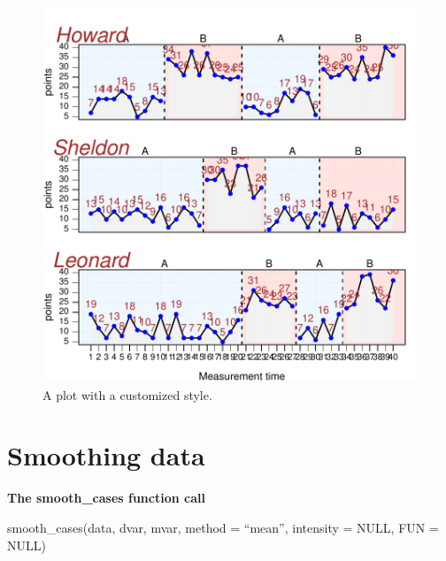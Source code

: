 \documentclass[
  letterpaper,
  DIV=11,
  numbers=noendperiod]{scrreprt}
\begin{document}
\begin{figure}[H]

{\centering \includegraphics{./app_supseded_functions_files/figure-pdf/custom_style_example-1.pdf}

}

\caption{A plot with a customized style.}

\end{figure}

\hypertarget{sec-smoothing}{%
\section{Smoothing data}\label{sec-smoothing}}

\begin{tcolorbox}[enhanced jigsaw, breakable, rightrule=.15mm, bottomrule=.15mm, arc=.35mm, colback=white, colframe=quarto-callout-tip-color-frame, opacityback=0, leftrule=.75mm, toprule=.15mm, left=2mm]
\begin{minipage}[t]{5.5mm}
\textcolor{quarto-callout-tip-color}{\faLightbulb}
\end{minipage}%
\begin{minipage}[t]{\textwidth - 5.5mm}

\textbf{The smooth\_cases function call}\vspace{2mm}

smooth\_cases(data, dvar, mvar, method = ``mean'', intensity = NULL, FUN
= NULL)

\end{minipage}%
\end{tcolorbox}
\end{document}
